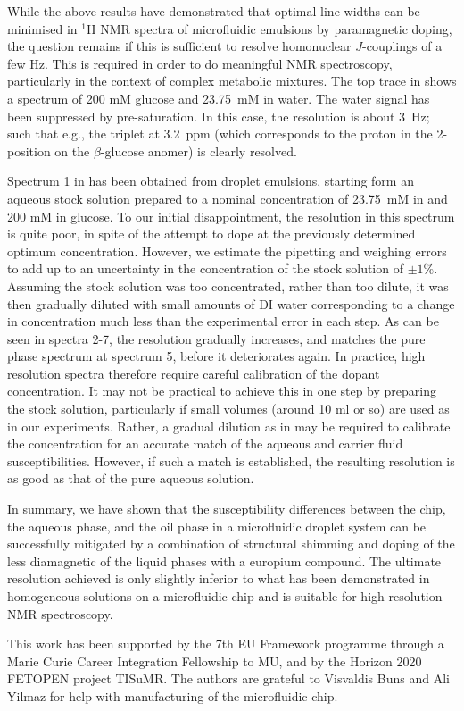 While the above results have demonstrated that optimal line widths can be minimised in $^1$H NMR
spectra of microfluidic emulsions by paramagnetic doping,
the question remains if this is sufficient to resolve homonuclear
$J$-couplings of a few Hz. This is required in order to do meaningful NMR spectroscopy,
particularly in the context of complex metabolic mixtures.
The top trace in  shows a spectrum of 200 mM glucose
and 23.75~mM  in water. The water signal has been suppressed by pre-saturation.
In this case, the resolution is about 3~Hz; such that e.g., the triplet at 3.2~ppm (which corresponds
to the proton in the 2-position on the $\beta$-glucose anomer) is clearly resolved.

Spectrum 1 in  has been obtained from
droplet emulsions, starting form an aqueous stock solution prepared to a nominal concentration
of 23.75~mM in  and 200 mM in glucose.
To our initial disappointment, the resolution in this spectrum is quite poor, in spite of
the attempt to dope at the previously determined optimum concentration. However, we estimate
the pipetting and weighing errors to add up to an uncertainty in the concentration of the
stock solution of $\pm 1\%$.
Assuming the stock solution was too concentrated, rather than too dilute, it was
then gradually diluted with small amounts of DI water corresponding
to a change in concentration much less than the experimental error in each step.
As can be seen in spectra 2-7, the resolution gradually increases, and matches
the pure phase spectrum at spectrum 5, before it deteriorates again.
In practice, high resolution spectra therefore require careful calibration of the dopant
concentration. It may not be practical to achieve this in one step by preparing the stock
solution, particularly if small volumes (around 10 ml or so) are used as in our
experiments. Rather, a gradual dilution as in  may be required
to calibrate the  concentration for an accurate match of
the aqueous and carrier fluid susceptibilities. However, if such a match is established,
the resulting resolution is as good as that of the pure aqueous solution.

In summary, we have shown that the susceptibility differences between the chip,
the aqueous phase, and the oil phase in a microfluidic droplet system can
be successfully mitigated by a combination of structural shimming and
doping of the less diamagnetic of the liquid phases with a europium compound.
The ultimate resolution achieved is only slightly inferior to what has been
demonstrated in homogeneous solutions on a microfluidic chip and is suitable for high
resolution NMR spectroscopy.

This work has been supported by the 7th EU Framework programme through a
Marie Curie Career Integration Fellowship to MU, and by the Horizon 2020 FETOPEN
project TISuMR. The authors are grateful to Visvaldis Buns and Ali Yilmaz for help
with manufacturing of the microfluidic chip.

\scriptsize{
 } %
